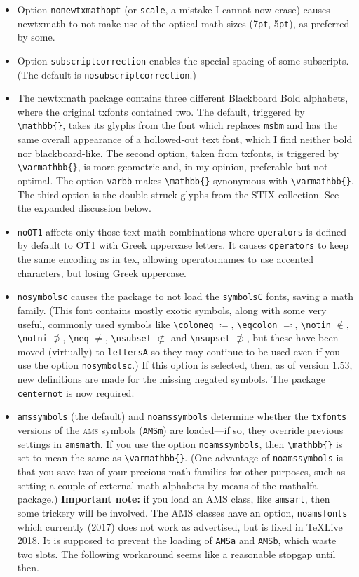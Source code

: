 \documentclass[\fsc]{article}
\theoremstyle{oldplain}
\theoremstyle{plain}
\begin{document}
\begin{itemize}
\item Option {\tt nonewtxmathopt} (or {\tt scale}, a mistake I cannot now erase) causes newtxmath to not make use of the optical math sizes (7{\tt pt}, 5{\tt pt}), as preferred by some.
\item Option {\tt subscriptcorrection} enables the special spacing of some subscripts. (The default is {\tt nosubscriptcorrection}.)
\item The \textsf{newtxmath} package contains three different Blackboard Bold alphabets, where the original \textsf{txfonts} contained two. The default, triggered by \verb|\mathbb{}|, takes its glyphs from the font which replaces {\tt msbm} and has the same overall appearance of a hollowed-out text font, which I find neither bold nor blackboard-like. The second option, taken from \textsf{txfonts}, is triggered by \verb|\varmathbb{}|, is more geometric and, in my opinion, preferable but not optimal. The option {\tt varbb} makes \verb|\mathbb{}| synonymous with \verb|\varmathbb{}|. The third option is the double-struck glyphs from the STIX collection. See the expanded discussion below.
\item {\tt noOT1} affects only those text-math combinations where {\tt operators} is defined by default to OT1 with Greek uppercase letters. It causes {\tt operators} to keep the same encoding as in tex, allowing operatornames to use accented characters, but losing Greek uppercase.
\item {\tt nosymbolsc} causes the package to not load the {\tt symbolsC} fonts, saving  a math family. (This font contains mostly exotic symbols, along with some very useful, commonly used symbols like \verb|\coloneq| $\coloneq$, \verb|\eqcolon| $\eqcolon$, \verb|\notin| $\notin$, \verb|\notni| $\notni$, \verb|\neq| $\neq$, \verb|\nsubset| $\nsubset$ and \verb|\nsupset| $\nsupset$, but these have been moved (virtually) to {\tt lettersA} so they may continue to be used even if you use the option {\tt nosymbolsc}.) If this option is selected, then, as of version 1.53, new definitions are made for the missing negated symbols. The package {\tt centernot} is now required.
\item {\tt amssymbols} (the default) and {\tt noamssymbols} determine whether the {\tt txfonts} versions of the \textsc{ams} symbols ({\tt AMSm}) are loaded---if so, they override previous settings in {\tt amsmath}. If you use the option {\tt noamssymbols}, then \verb|\mathbb{}| is set to mean the same as \verb|\varmathbb{}|. (One advantage of {\tt noamssymbols} is that you save two of your precious math families for other purposes, such as setting a couple of external math alphabets by means of the \textsf{mathalfa} package.) \textbf{Important note:} if you load an AMS class, like {\tt amsart}, then some trickery will be involved. The AMS classes have an option, {\tt noamsfonts} which currently (2017) does not work as advertised, but is fixed in \TeX Live 2018. It is supposed to prevent the loading of {\tt AMSa} and {\tt AMSb}, which waste two slots. The following workaround seems like a reasonable stopgap until then.

\end{itemize}
\end{document}
